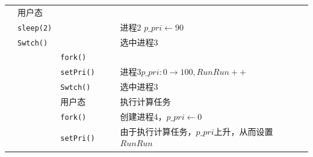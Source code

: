 \begin{landscape}
\begin{longtable}{llllll}
                 &     用户态            &         &           &             &            \\
                 &    \texttt{sleep(2)} &          &           &      & 进程2 $p\_pri\gets90$      \\
                 &     \texttt{Swtch()} &          &           &             &选中进程3                  \\
                 &                      & \texttt{fork()}       &           &             &  \\
                 &                      & \texttt{setPri()}    &           &             &进程3$p\_pri:0\rightarrow 100,RunRun++$ \\
                 &                      & \texttt{Swtch()}    &           &             &选中进程3 \\
                 &                      &用户态               &           &             & 执行计算任务\\
                 &                      & \texttt{fork()}    &           &             &创建进程4，$p\_pri\gets0$                  \\
                 &                      & \texttt{setPri()}    &           &             &由于执行计算任务，$p\_pri$上升，从而设置$RunRun$ \\


\end{longtable}
\end{landscape}
